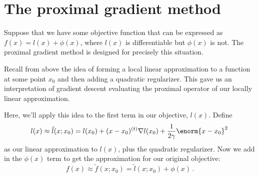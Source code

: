 \documentclass{article}
\begin{document}
\section{The proximal gradient method}

Suppose that we have some objective function that can be expressed as $f(x) = l(x) + \phi(x)$, where $l(x)$ is differentiable but $\phi(x)$ is not.  The proximal gradient method is designed for precisely this situation.

Recall from above the idea of forming a local linear approximation to a function at some point $x_0$ and then adding a quadratic regularizer.  This gave us an interpretation of gradient descent evaluating the proximal operator of our locally linear approximation.

Here, we'll apply this idea to the first term in our objective, $l(x)$. Define
$$
l(x) \approx \tilde{l}(x; x_0) = l(x_0) + (x - x_0)^{(t)} \nabla l(x_0) + \frac{1}{2\gamma} \enorm{x - x_0}^2 \, 
$$
as our linear approximation to $l(x)$, plus the quadratic regularizer.  Now we add in the $\phi(x)$ term to get the approximation for our original objective:
\begin{equation}
\label{eqn:pg_approx}
f(x) \approx \tilde{f}(x; x_0) = \tilde{l}(x; x_0) + \phi(x)   \, .
\end{equation}
\end{document}

